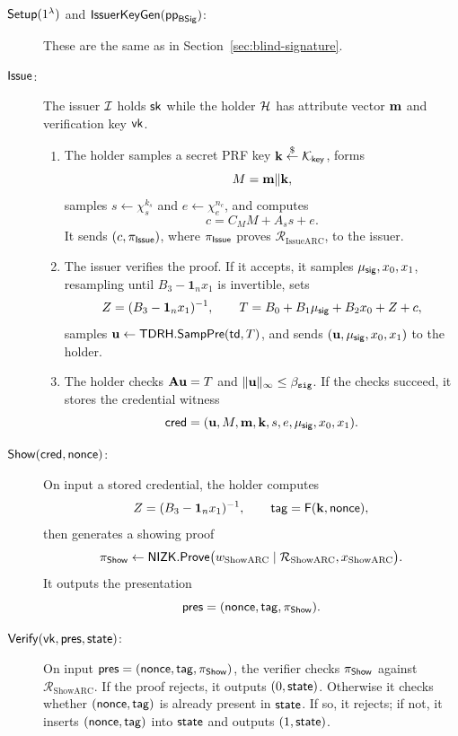 \begin{description}
\item[\(\mathsf{Setup}(1^\lambda)\) and \(\mathsf{IssuerKeyGen}(\mathsf{pp}_{\mathsf{BSig}})\):] These are the same as in
Section~\ref{sec:blind-signature}.

\item[\(\mathsf{Issue}\):] The issuer \(\mathcal{I}\) holds \(\mathsf{sk}\) while the holder \(\mathcal{H}\) has attribute vector \(\mathbf{m}\)
and verification key \(\mathsf{vk}\).
\begin{enumerate}[leftmargin=1.25em]
  \item The holder samples a secret PRF key \(\mathbf{k}\overset{\$}{\leftarrow}\mathcal K_{\mathsf{key}}\), forms
  \[
    M=\mathbf{m}\Vert\mathbf{k},
  \]
  samples \(s\leftarrow\chi_s^{k_s}\) and \(e\leftarrow\chi_e^{n_c}\), and computes
  \[
    c=C_MM+A_s s+e.
  \]
  It sends \((c,\pi_{\mathsf{Issue}})\), where \(\pi_{\mathsf{Issue}}\) proves \(\mathcal R_{\mathrm{IssueARC}}\), to the issuer.
  \item The issuer verifies the proof.  If it accepts, it samples \(\mu_{\mathsf{sig}},x_0,x_1\), resampling until
  \(B_3-\mathbf 1_nx_1\) is invertible, sets
  \[
    Z=(B_3-\mathbf 1_nx_1)^{-1},
    \qquad
    T=B_0+B_1\mu_{\mathsf{sig}}+B_2x_0+Z+c,
  \]
  samples \(\mathbf{u}\gets\mathsf{TDRH}.\mathsf{SampPre}(\mathsf{td},T)\), and sends \((\mathbf{u},\mu_{\mathsf{sig}},x_0,x_1)\) to the holder.
  \item The holder checks \(\mathbf{A}\mathbf{u}=T\) and \(\|\mathbf{u}\|_\infty\le\beta_{\mathtt{sig}}\).  If the checks succeed, it stores
  the credential witness
  \[
    \mathsf{cred}=(\mathbf{u},M,\mathbf{m},\mathbf{k},s,e,\mu_{\mathsf{sig}},x_0,x_1).
  \]
\end{enumerate}

\item[\(\mathsf{Show}(\mathsf{cred},\mathsf{nonce})\):] On input a stored credential, the holder computes
\[
  Z=(B_3-\mathbf 1_nx_1)^{-1},
  \qquad
  \mathsf{tag}=\mathsf{F}(\mathbf{k},\mathsf{nonce}),
\]
then generates a showing proof
\[
  \pi_{\mathsf{Show}}\gets \mathsf{NIZK}.\mathsf{Prove}
    \bigl(w_{\mathrm{ShowARC}}\mid \mathcal R_{\mathrm{ShowARC}},x_{\mathrm{ShowARC}}\bigr).
\]
It outputs the presentation
\[
  \mathsf{pres}=(\mathsf{nonce},\mathsf{tag},\pi_{\mathsf{Show}}).
\]

\item[\(\mathsf{Verify}(\mathsf{vk},\mathsf{pres},\mathsf{state})\):] On input \(\mathsf{pres}=(\mathsf{nonce},\mathsf{tag},\pi_{\mathsf{Show}})\), the verifier
checks \(\pi_{\mathsf{Show}}\) against \(\mathcal R_{\mathrm{ShowARC}}\).  If the proof rejects, it outputs
\((0,\mathsf{state})\).  Otherwise it checks whether \((\mathsf{nonce},\mathsf{tag})\) is already present in \(\mathsf{state}\).  If so,
it rejects; if not, it inserts \((\mathsf{nonce},\mathsf{tag})\) into \(\mathsf{state}\) and outputs \((1,\mathsf{state})\).
\end{description}

